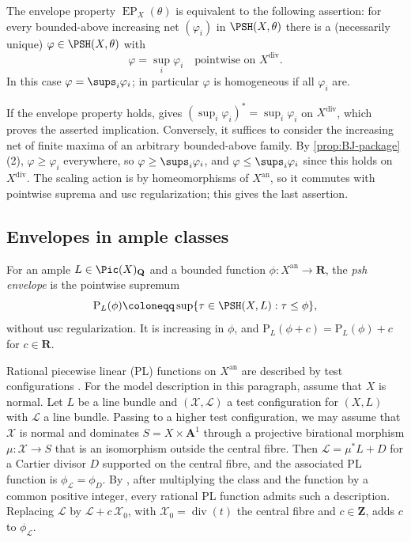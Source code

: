 \documentclass[11pt,a4paper]{article}
\newcommand{\an}{\mathrm{an}}          %
\newcommand{\divv}{\mathrm{div}}       %
\newcommand{\EP}{\operatorname{EP}}
\begin{document}
\begin{proposition}\label{prop:EP-criterion}
The envelope property $\EP_X(\theta)$ is equivalent to the following assertion: for every bounded-above increasing net $(\varphi_i)$ in $\PSH(X,\theta)$ there is a \textup(necessarily unique\textup) $\varphi\in\PSH(X,\theta)$ with
\[
  \varphi=\sup_i\varphi_i
  \quad\text{pointwise on }X^{\divv}.
\]
In this case $\varphi=\sups_i\varphi_i$; in particular $\varphi$ is homogeneous if all $\varphi_i$ are.
\end{proposition}

If the envelope property holds, \cite[Theorem~5.6]{BJ22} gives $(\sup_i\varphi_i)^*=\sup_i\varphi_i$ on $X^{\divv}$, which proves the asserted implication. Conversely, it suffices to consider the increasing net of finite maxima of an arbitrary bounded-above family. By \cref{prop:BJ-package}(2), $\varphi\ge\varphi_i$ everywhere, so $\varphi\ge\sups_i\varphi_i$, and $\varphi\le\sups_i\varphi_i$ since this holds on $X^{\divv}$. The scaling action is by homeomorphisms of $X^{\an}$, so it commutes with pointwise suprema and usc regularization; this gives the last assertion.

\subsection{Envelopes in ample classes}\label{subsec:prelim-envelopes}

For an ample $L\in\Pic(X)_{\mathbf Q}$ and a bounded function $\phi\colon X^{\an}\to\mathbf R$, the \emph{psh envelope} is the pointwise supremum
\[
  \mathrm{P}_L(\phi)\coloneqq\sup\{\tau\in\PSH(X,L):\tau\leq\phi\},
\]
without usc regularization. It is increasing in $\phi$, and $\mathrm P_L(\phi+c)=\mathrm P_L(\phi)+c$ for $c\in\mathbf R$.

Rational piecewise linear (PL) functions on $X^{\an}$ are described by test configurations \cite[\S2]{BJ22}. For the model description in this paragraph, assume that $X$ is normal. Let $L$ be a line bundle and $(\mathcal X,\mathcal L)$ a test configuration for $(X,L)$ with $\mathcal L$ a line bundle. Passing to a higher test configuration, we may assume that $\mathcal X$ is normal and dominates $S=X\times\mathbf A^1$ through a projective birational morphism $\mu\colon\mathcal X\to S$ that is an isomorphism outside the central fibre. Then $\mathcal L=\mu^*L+D$ for a Cartier divisor $D$ supported on the central fibre, and the associated PL function is $\phi_{\mathcal L}=\phi_D$. By \cite[Theorem~2.31]{BJ22}, after multiplying the class and the function by a common positive integer, every rational PL function admits such a description. Replacing $\mathcal L$ by $\mathcal L+c\,\mathcal X_0$, with $\mathcal X_0=\operatorname{div}(t)$ the central fibre and $c\in\mathbf Z$, adds $c$ to $\phi_{\mathcal L}$.
\end{document}
